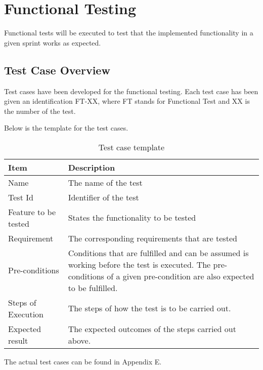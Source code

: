 \section{Functional Testing}

Functional tests will be executed to test that the implemented functionality in a given sprint works as expected.

\subsection*{Test Case Overview}

Test cases have been developed for the functional testing. Each test case has been given an identification FT-XX, where FT stands for Functional Test and XX is the number of the test.

Below is the template for the test cases.


\begin{table}[H]
\centering
	\begin{tabular}{ l | p{8cm} }
		\hline
		\rowcolor{lightgray}
		{\bf Item} & {\bf Description} \\ \hline
		Name & The name of the test \\ 
		Test Id & Identifier of the test \\ 
		Feature to be tested & States the functionality to be tested \\ 
		Requirement & The corresponding requirements that are tested \\ 
		Pre-conditions & Conditions that are fulfilled and can be assumed is working before the test is executed. The pre-conditions of a given pre-condition are also expected to be fulfilled. \\ 
		Steps of Execution & The steps of how the test is to be carried out. \\ 
		Expected result & The expected outcomes of the steps carried out above. \\ 
	\end{tabular}
	\caption{Test case template}
\end{table}

The actual test cases can be found in Appendix E.
